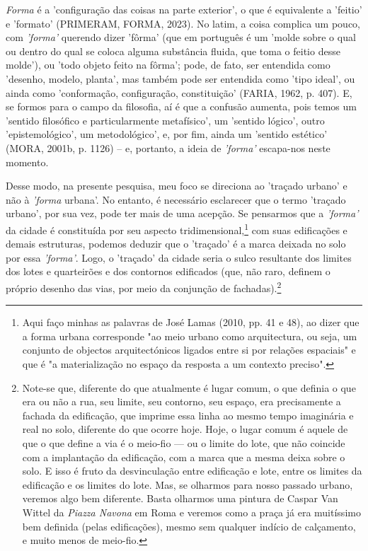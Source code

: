 \documentclass[]{report}
\begin{document}
\textit{Forma} é a 'configuração das coisas na parte exterior', o que é equivalente a 'feitio' e 'formato' (PRIMERAM, FORMA, 2023). No latim, a coisa complica um pouco, com \textit{'forma'} querendo dizer 'fôrma' (que em português é um 'molde sobre o qual ou dentro do qual se coloca alguma substância fluida, que toma o feitio desse molde'), ou 'todo objeto feito na fôrma'; pode, de fato, ser entendida como 'desenho, modelo, planta', mas também pode ser entendida como 'tipo ideal', ou ainda como 'conformação, configuração, constituição' (FARIA, 1962, p. 407). E, se formos para o campo da filosofia, aí é que a confusão aumenta, pois temos um 'sentido filosófico e particularmente metafísico', um 'sentido lógico', outro 'epistemológico', um metodológico', e, por fim, ainda um 'sentido estético' (MORA, 2001b, p. 1126) – e, portanto, a ideia de \textit{'forma'} escapa-nos neste momento.

Desse modo, na presente pesquisa, meu foco se direciona ao 'traçado urbano' e não à \textit{'forma} urbana'. No entanto, é necessário esclarecer que o termo 'traçado urbano', por sua vez, pode ter mais de uma acepção. Se pensarmos que a \textit{'forma'} da cidade é constituída por seu aspecto tridimensional,\footnote[6]{Aqui faço minhas as palavras de José Lamas (2010, pp. 41 e 48), ao dizer que a forma urbana corresponde "ao meio urbano como arquitectura, ou seja, um conjunto de objectos arquitectónicos ligados entre si por relações espaciais" e que é "a materialização no espaço da resposta a um contexto preciso".} com suas edificações e demais estruturas, podemos deduzir que o 'traçado' é a marca deixada no solo por essa \textit{'forma'}. Logo, o 'traçado' da cidade seria o sulco resultante dos limites dos lotes e quarteirões e dos contornos edificados (que, não raro, definem o próprio desenho das vias, por meio da conjunção de fachadas).\footnote[7]{Note-se que, diferente do que atualmente é lugar comum, o que definia o que era ou não a rua, seu limite, seu contorno, seu espaço, era precisamente a fachada da edificação, que imprime essa linha ao mesmo tempo imaginária e real no solo, diferente do que ocorre hoje. Hoje, o lugar comum é aquele de que o que define a via é o meio-fio — ou o limite do lote, que não coincide com a implantação da edificação, com a marca que a mesma deixa sobre o solo. E isso é fruto da desvinculação entre edificação e lote, entre os limites da edificação e os limites do lote. Mas, se olharmos para nosso passado urbano, veremos algo bem diferente. Basta olharmos uma pintura de Caspar Van Wittel da \textit{Piazza Navona} em Roma e veremos como a praça já era muitíssimo bem definida (pelas edificações), mesmo sem qualquer indício de calçamento, e muito menos de meio-fio.} 
\end{document}
